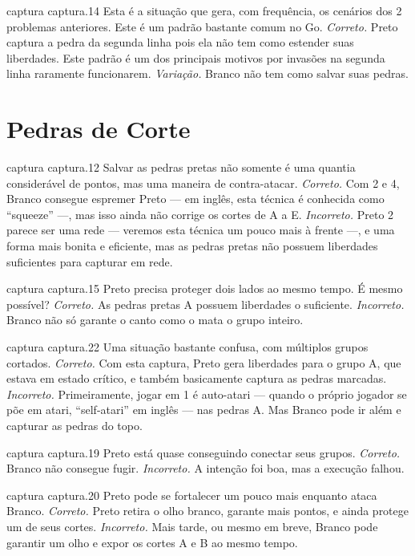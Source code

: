 \problemAnswerDiagram
  {captura}
  {captura.14}
  {Esta é a situação que gera, com frequência, os cenários dos 2 problemas anteriores. Este é um padrão bastante comum no Go.}
  {\emph{Correto.} Preto captura a pedra da segunda linha pois ela não tem como estender suas liberdades. Este padrão é um dos principais motivos por invasões na segunda linha raramente funcionarem.}
  {\emph{Variação.} Branco não tem como salvar suas pedras.}

\chapter{Pedras de Corte}

\emptypage

\problemAnswerDiagram
  {captura}
  {captura.12}
  {Salvar as pedras pretas não somente é uma quantia considerável de pontos, mas uma maneira de contra-atacar.}
  {\emph{Correto.} Com 2 e 4, Branco consegue espremer Preto --- em inglês, esta técnica é conhecida como ``squeeze'' ---, mas isso ainda não corrige os cortes de A a E.}
  {\emph{Incorreto.} Preto 2 parece ser uma rede --- veremos esta técnica um pouco mais à frente ---, e uma forma mais bonita e eficiente, mas as pedras pretas não possuem liberdades suficientes para capturar em rede.}

\problemAnswerDiagram
  {captura}
  {captura.15}
  {Preto precisa proteger dois lados ao mesmo tempo. É mesmo possível?}
  {\emph{Correto.} As pedras pretas A possuem liberdades o suficiente.}
  {\emph{Incorreto.} Branco não só garante o canto como o mata o grupo inteiro.}

\problemAnswerDiagram
  {captura}
  {captura.22}
  {Uma situação bastante confusa, com múltiplos grupos cortados.}
  {\emph{Correto.} Com esta captura, Preto gera liberdades para o grupo A, que estava em estado crítico, e também basicamente captura as pedras marcadas.}
  {\emph{Incorreto.} Primeiramente, jogar em 1 é auto-atari --- quando o próprio jogador se põe em atari, ``self-atari'' em inglês --- nas pedras A. Mas Branco pode ir além e capturar as pedras do topo.}

\problemAnswerDiagram
  {captura}
  {captura.19}
  {Preto está quase conseguindo conectar seus grupos.}
  {\emph{Correto.} Branco não consegue fugir.}
  {\emph{Incorreto.} A intenção foi boa, mas a execução falhou.}

\problemAnswerDiagram
  {captura}
  {captura.20}
  {Preto pode se fortalecer um pouco mais enquanto ataca Branco.}
  {\emph{Correto.} Preto retira o olho branco, garante mais pontos, e ainda protege um de seus cortes.}
  {\emph{Incorreto.} Mais tarde, ou mesmo em breve, Branco pode garantir um olho e expor os cortes A e B ao mesmo tempo.}

